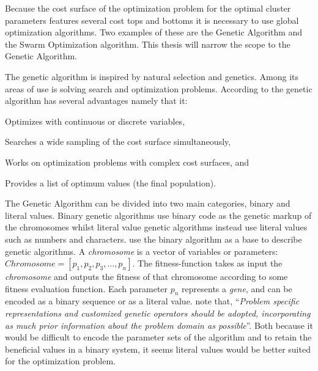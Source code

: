 Because the cost surface of the optimization problem for the optimal \CTC cluster parameters features several cost tops and bottoms it is necessary to use global optimization algorithms. Two examples of these are the Genetic Algorithm and the Swarm Optimization algorithm. This thesis will narrow the scope to the Genetic Algorithm.

The genetic algorithm is inspired by natural selection and genetics. Among its areas of use is solving search and optimization problems. According to \citeauthor[23]{Haupt2004} the genetic algorithm has several advantages namely that it:
\begin{inparaenum}[\itshape 1\upshape)]
\item Optimizes with continuous or discrete variables,
\item Searches a wide sampling of the cost surface simultaneously,
\item Works on optimization problems with complex cost surfaces, and
\item Provides a list of optimum values (the final population).
\end{inparaenum}

The Genetic Algorithm can be divided into two main categories, binary and literal values. Binary genetic algorithms use binary code as the genetic markup of the chromosomes whilst literal value genetic algorithms instead use literal values such as numbers and characters. \citeauthor{Haupt2004a} use the binary algorithm as a base to describe genetic algorithms. A \textit{chromosome} is a vector of variables or parameters: \(Chromosome = [p_{1},p_{2},p_{3},\dots,p_{n}]\). The fitness-function takes as input the \textit{chromosome} and outputs the fitness of that chromosome according to some fitness evaluation function. Each parameter \(p_{n}\) represents a \textit{gene}, and can be encoded as a binary sequence or as a literal value. \citeauthor[p. 93]{Brownlee2011} note that, ``\textit{Problem specific representations and customized genetic operators should be adopted, incorporating as much prior information about the problem domain as possible}''. Both because it would be difficult to encode the parameter sets of the \CTC algorithm and to retain the beneficial values in a binary system, it seems literal values would be better suited for the optimization problem.


